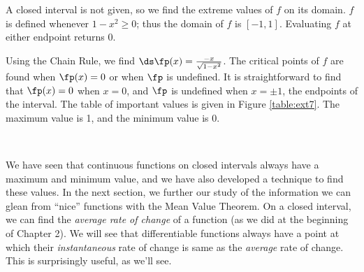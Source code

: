 {A closed interval is not given, so we find the extreme values of $f$ on its domain. $f$ is defined whenever $1-x^2\geq 0$; thus the domain of $f$ is $[-1,1]$. Evaluating $f$ at either endpoint returns 0. 

Using the Chain Rule, we find $\ds \fp(x) = \frac{-x}{\sqrt{1-x^2}}$. The critical points of $f$ are found when $\fp(x) = 0$ or when $\fp$ is undefined. It is straightforward to find that $\fp(x) = 0$ when $x=0$, and $\fp$ is undefined when $x=\pm 1$, the endpoints of the interval. The table of important values is given in Figure \ref{table:ext7}. The maximum value is 1, and the minimum value is 0.
}\\




We have seen that continuous functions on closed intervals always have a maximum and minimum value, and we have also developed a technique to find these values. In the next section, we further our study of the information we can glean from ``nice'' functions with the Mean Value Theorem. On a closed interval, we can find the \textit{average rate of change} of a function (as we did at the beginning of Chapter 2). We will see that differentiable functions always have a point at which their \textit{instantaneous} rate of change is same as the \textit{average} rate of change. This is surprisingly useful, as we'll see.






